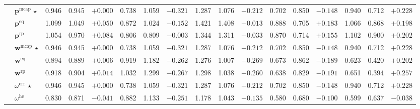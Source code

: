 \documentclass[eng]{kjas3}
\begin{document}
\begin{table}[t]
{\begin{tabular}{ll ccc ccc ccc ccc ccc}
  & $\mathbf{p}^{\mathrm{mcap}}$ $\star$ & 0.946 & 0.945 & $+0.000$              & 0.738 & 1.059 & $-0.321$ & 1.287 & 1.076 & $+0.212$ & 0.702 & 0.850 & $-0.148$ & 0.940 & 0.712 & $+0.228$ \\
  & $\mathbf{p}^{\mathrm{eq}}$          & 1.099 & 1.049 & $+0.050$ & 0.872 & 1.024 & $-0.152$ & 1.421 & 1.408 & $+0.013$ & 0.888 & 0.705 & $+0.183$ & 1.066 & 0.868 & $+0.198$ \\
  & $\mathbf{p}^{\mathrm{rp}}$          & 1.054 & 0.970 & $+0.084$ & 0.806 & 0.809 & $-0.003$ & 1.344 & 1.311 & $+0.033$ & 0.870 & 0.714 & $+0.155$ & 1.102 & 0.900 & $+0.202$ \\
\midrule
{}
  & $\mathbf{w}^{\mathrm{mcap}}$ $\star$ & 0.946 & 0.945 & $+0.000$            & 0.738 & 1.059 & $-0.321$ & 1.287 & 1.076 & $+0.212$ & 0.702 & 0.850 & $-0.148$ & 0.940 & 0.712 & $+0.228$ \\
  & $\mathbf{w}^{\mathrm{eq}}$           & 0.894 & 0.889 & $+0.006$ & 0.919 & 1.182 & $-0.262$ & 1.276 & 1.007 & $+0.269$ & 0.673 & 0.862 & $-0.189$ & 0.623 & 0.420 & $+0.202$ \\
  & $\mathbf{w}^{\mathrm{rp}}$           & 0.918 & 0.904 & $+0.014$ & 1.032 & 1.299 & $-0.267$ & 1.298 & 1.038 & $+0.260$ & 0.638 & 0.829 & $-0.191$ & 0.651 & 0.394 & $+0.257$ \\
\midrule
{}
  & $\omega^{\mathrm{err}}$ $\star$ & 0.946 & 0.945 & $+0.000$             & 0.738 & 1.059 & $-0.321$ & 1.287 & 1.076 & $+0.212$ & 0.702 & 0.850 & $-0.148$ & 0.940 & 0.712 & $+0.228$ \\
  & $\omega^{\mathrm{he}}$          & 0.830 & 0.871 & $-0.041$  & 0.882 & 1.133 & $-0.251$ & 1.178 & 1.043 & $+0.135$ & 0.580 & 0.680 & $-0.100$ & 0.599 & 0.637 & $-0.038$ \\
\bottomrule
\end{tabular}%
}
\end{table}
\end{document}
